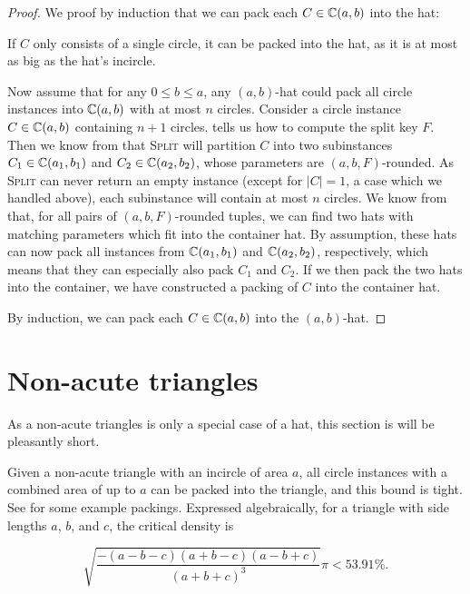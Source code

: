 \documentclass[a4paper,style=print,bibliography=totoc,nexus,lnum,extramargin]{tubsbook}
\begin{document}
\begin{proof}
    We proof by induction that we can pack each $C \in \mathbb{C}(a,b)$ into the hat:

    If $C$ only consists of a single circle, it can be packed into the hat, as it is at most as big as the hat's incircle.

    Now assume that for any $0 \le b \le a$, any $(a,b)$-hat could pack all circle instances into $\mathbb{C}(a,b)$ with at most $n$ circles. Consider a circle instance $C \in \mathbb{C}(a,b)$ containing $n+1$ circles.
     tells us how to compute the split key $F$.
    Then we know from  that \textsc{Split} will partition $C$ into two subinstances $C_1 \in \mathbb{C}(a_1, b_1)$ and $C_2 \in \mathbb{C}(a_2, b_2)$, whose parameters are $(a,b,F)$-rounded. As \textsc{Split} can never return an empty instance (except for $|C| = 1$, a case which we handled above), each subinstance will contain at most $n$ circles. We know from  that, for all pairs of $(a,b,F)$-rounded tuples, we can find two hats with matching parameters which fit into the container hat. By assumption, these hats can now pack all instances from $\mathbb{C}(a_1, b_1)$ and $\mathbb{C}(a_2, b_2)$, respectively, which means that they can especially also pack $C_1$ and $C_2$. If we then pack the two hats into the container, we have constructed a packing of $C$ into the container hat.

    By induction, we can pack each $C \in \mathbb{C}(a,b)$ into the $(a,b)$-hat.
\end{proof}

\pagebreak

\section{Non-acute triangles}

As a non-acute triangles is only a special case of a hat, this section is will be pleasantly short.

\begin{theorem}\label{th:tri}
    Given a non-acute triangle with an incircle of area $a$, all circle instances with a combined area of up to $a$ can be packed into the triangle, and this bound is tight.
    See  for some example packings.
    Expressed algebraically, for a triangle with side lengths $a$, $b$, and $c$, the critical density is

    $$\sqrt{\dfrac{-(a-b-c)(a+b-c)(a-b+c)}{(a+b+c)^3}}\pi < 53.91\%.$$
\end{theorem}
\end{document}
